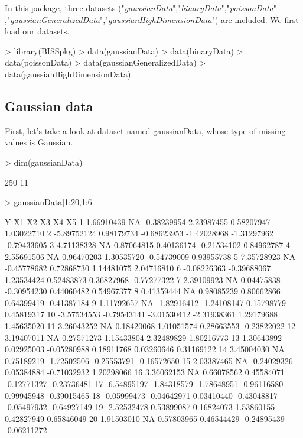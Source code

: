 \documentclass[a4paper]{article}
\begin{document}
In this package, three datasets ("\emph{gaussianData}","\emph{binaryData}","\emph{poissonData}"\\,"\emph{gaussianGeneralizedData}","\emph{gaussianHighDimensionData}") are included. We first load our datasets. 
\begin{Schunk}
\begin{Sinput}
> library(BISSpkg)
> data(gaussianData)
> data(binaryData)
> data(poissonData)
> data(gaussianGeneralizedData)
> data(gaussianHighDimensionData)
\end{Sinput}
\end{Schunk}

\subsection{Gaussian data}
    First, let's take a look at dataset named gaussianData, whose type of missing values is Gaussian.
\begin{Schunk}
\begin{Sinput}
> dim(gaussianData)
\end{Sinput}
\begin{Soutput}
[1] 250  11
\end{Soutput}
\begin{Sinput}
> gaussianData[1:20,1:6]
\end{Sinput}
\begin{Soutput}
             Y          X1          X2          X3          X4          X5
1   1.66910439          NA -0.38239954  2.23987455  0.58207947  1.03022710
2  -5.89752124  0.98179734 -0.68623953 -1.42028968 -1.31297962 -0.79433605
3   4.71138328          NA  0.87064815  0.40136174 -0.21534102  0.84962787
4   2.55691506          NA  0.96470203  1.30535720 -0.54739009  0.93955738
5   7.35728923          NA -0.45778682  0.72868730  1.14481075  2.04716810
6  -0.08226363 -0.39688067  1.23534424  0.52483873  0.36827968 -0.77277322
7   2.39109923          NA  0.04475838 -0.30954230  0.44060482  0.54967377
8   0.41359444          NA  0.98085239  0.80662866  0.64399419 -0.41387184
9   1.11792657          NA -1.82916412 -1.24108147  0.15798779  0.45819317
10 -3.57534553 -0.79543141 -3.01530412 -2.31938361  1.29179688  1.45635020
11  3.26043252          NA  0.18420068  1.01051574  0.28663553 -0.23822022
12  3.19407011          NA  0.27571273  1.15433804  2.32489829  1.80216773
13  1.30643892  0.02925003 -0.05280988  0.18911768  0.03260646  0.31169122
14  3.45004030          NA  0.75189219 -1.72502506 -0.25553791 -0.16572650
15  2.03387465          NA -0.24029326  0.05384884 -0.71032932  1.20298066
16  3.36062153          NA  0.66078562  0.45584071 -0.12771327 -0.23736481
17 -6.54895197 -1.84318579 -1.78648951 -0.96116580  0.99945948 -0.39015465
18 -0.05999473 -0.04642971  0.03410440 -0.43048817 -0.05497932 -0.64927149
19 -2.52532478  0.53899087  0.16824073  1.53860155  0.42827949  0.65846049
20  1.91503010          NA  0.57803965  0.46544429 -0.24895439 -0.06211272
\end{Soutput}
\end{Schunk}
\end{document}
